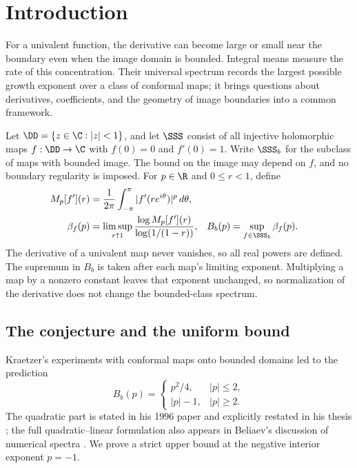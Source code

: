 \begin{abstract}
We prove a uniform upper bound for inverse-first-power integral means
of normalized univalent disk maps with exponent strictly below \(1/4\).
Consequently, the bounded universal integral-means spectrum satisfies
\(B_b(-1)<1/4\), disproving Kraetzer's conjectured spectrum at \(p=-1\).
\end{abstract}
\section{Introduction}\label{sec:introduction}

For a univalent function, the derivative can become large or small near
the boundary even when the image domain is bounded. Integral means
measure the rate of this concentration. Their universal spectrum records
the largest possible growth exponent over a class of conformal maps;
it brings questions about derivatives, coefficients, and the geometry
of image boundaries into a common framework.

Let \(\DD=\{z\in\C:|z|<1\}\), and let \(\SSS\) consist of all
injective holomorphic maps \(f:\DD\to\C\) with \(f(0)=0\) and
\(f'(0)=1\). Write \(\SSS_b\) for the subclass of maps with bounded
image. The bound on the image may depend on \(f\), and no boundary
regularity is imposed. For \(p\in\R\) and \(0\le r<1\), define
\begin{align*}
 M_p[f'](r)&=\frac1{2\pi}\int_{-\pi}^{\pi}|f'(re^{i\theta})|^p\,d\theta,\\
 \beta_f(p)&=\limsup_{r\uparrow1}
 \frac{\log M_p[f'](r)}{\log(1/(1-r))},
 &B_b(p)&=\sup_{f\in\SSS_b}\beta_f(p).
\end{align*}
The derivative of a univalent map never vanishes, so all real powers
are defined. The supremum in \(B_b\) is taken after each map's limiting
exponent. Multiplying a map by a nonzero constant leaves that exponent
unchanged, so normalization of the derivative does not change the
bounded-class spectrum.

\subsection{The conjecture and the uniform bound}

Kraetzer's experiments with conformal maps onto bounded domains led
to the prediction
\begin{equation}\label{eq:kraetzer}
 B_b(p)=
 \begin{cases}
 p^2/4,&|p|\le2,\\
 |p|-1,&|p|\ge2.
 \end{cases}
\end{equation}
The quadratic part is stated in his 1996 paper and explicitly
restated in his thesis \cite{Kraetzer,KraetzerThesis}; the full
quadratic--linear formulation also appears in Beliaev's discussion
of numerical spectra \cite{Beliaev}. We prove a strict upper bound
at the negative interior exponent \(p=-1\).


